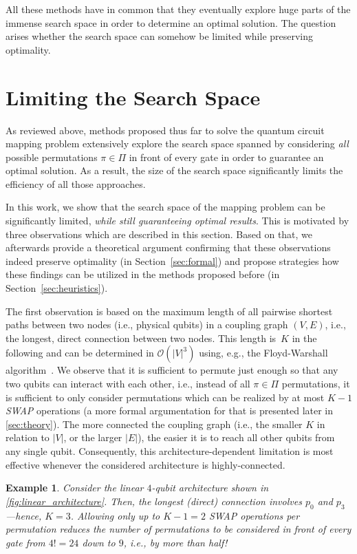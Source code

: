 \documentclass[10pt,conference]{IEEEtran}
\newtheorem{example}{Example}
\begin{document}
All these methods have in common that they eventually explore huge parts of the immense search space in order to determine an optimal solution. The question arises whether the search space can somehow be limited while preserving optimality.

\section{Limiting the Search Space}\label{sec:general}

As reviewed above, methods proposed thus far to solve the quantum circuit mapping problem extensively explore the search space spanned by considering \emph{all} possible permutations $\pi \in \Pi$ in front of every gate in order to guarantee an optimal solution.
As a result, the size of the search space significantly limits the efficiency of all those approaches.


In this work, we show that the search space of the mapping problem can be significantly limited, \emph{while still guaranteeing optimal results}. This is motivated by three observations which are described in this section. Based on that, we afterwards provide a theoretical argument confirming that these observations indeed preserve optimality (in Section~\ref{sec:formal}) and propose strategies how these findings can be utilized in the methods proposed before (in Section~\ref{sec:heuristics}). 

The first observation is based on the maximum length of all pairwise shortest paths between two nodes (i.e., physical qubits) in a coupling graph $(V, E)$, i.e., the longest, direct connection between two nodes. 
This length is~$K$ in the following and can be determined in $\mathcal{O}(|V|^3)$ using, e.g., the Floyd-Warshall algorithm~\cite{cormenIntroductionAlgorithmsThird2009}. 
We observe that it is sufficient to permute just enough so that any two qubits can interact with each other, i.e., instead of all $\pi\in\Pi$ permutations, it is sufficient to only consider permutations which can be realized by at most $K-1$ \textit{SWAP} operations (a more formal argumentation for that is presented later in \autoref{sec:theory}).
The more connected the coupling graph (i.e., the smaller $K$ in relation to $|V|$, or the larger $|E|$), the easier it is to reach all other qubits from any single qubit.
Consequently, this architecture-dependent limitation is most effective whenever the considered architecture is highly-connected.

\begin{example}\label{ex:perm_reduction}
	Consider the linear $4$-qubit architecture shown in \autoref{fig:linear_architecture}.
	Then, the longest (direct) connection involves $p_0$ and $p_3$---hence, \mbox{$K=3$}. Allowing only up to $K-1=2$ \textit{SWAP} operations per permutation reduces the number of permutations to be considered in front of every gate from $4!=24$ down to $9$, i.e., by more than half!
\end{example}
\end{document}
